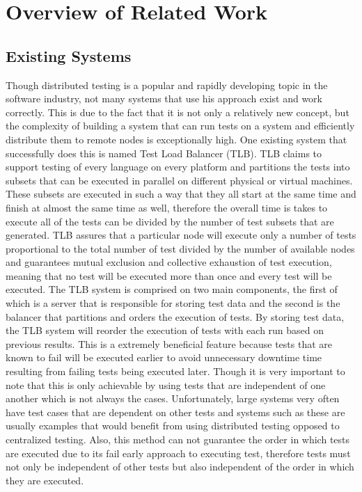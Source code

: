 \documentclass{article}
\begin{document}
{\section{Overview of Related Work}
\label{related}
\subsection{Existing Systems}
\label{existing}

Though distributed testing is a popular and rapidly developing topic in the software industry, not many systems that use his approach exist and work correctly. This is due to the fact that it is not only a relatively new concept, but the complexity of building a system that can run tests on a system and efficiently distribute them to remote nodes is exceptionally high. One existing system that successfully does this is named Test Load Balancer (TLB). TLB claims to support testing of every language on every platform and partitions the tests into subsets that can be executed in parallel on different physical or virtual machines. These subsets are executed in such a way that they all start at the same time and finish at almost the same time as well, therefore the overall time is takes to execute all of the tests can be divided by the number of test subsets that are generated. TLB assures that a particular node will execute only a number of tests proportional to the total number of test divided by the number of available nodes and guarantees mutual exclusion and collective exhaustion of test execution, meaning that no test will be executed more than once and every test will be executed. The TLB system is comprised on two main components, the first of which is a server that is responsible for storing test data and the second is the balancer that partitions and orders the execution of tests. By storing test data, the TLB system will reorder the execution of tests with each run based on previous results. This is a extremely beneficial feature because tests that are known to fail will be executed earlier to avoid unnecessary downtime time resulting from failing tests being executed later. Though it is very important to note that this is only achievable by using tests that are independent of one another which is not always the cases. Unfortunately, large systems very often have test cases that are dependent on other tests and systems such as these are usually examples that would benefit from using distributed testing opposed to centralized testing. Also, this method can not guarantee the order in which tests are executed due to its fail early approach to executing test, therefore tests must not only be independent of other tests but also independent of the order in which they are executed.

}
\end{document}
